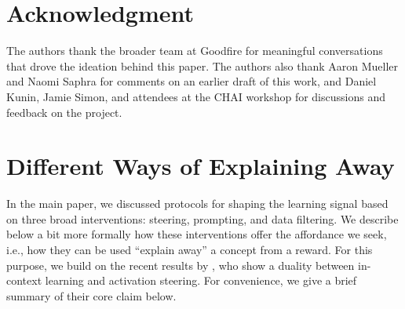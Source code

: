 \documentclass{article} %
\begin{document}
\section*{Acknowledgment}
The authors thank the broader team at Goodfire for meaningful conversations that drove the ideation behind this paper. The authors also thank Aaron Mueller and Naomi Saphra for comments on an earlier draft of this work, and Daniel Kunin, Jamie Simon, and attendees at the CHAI workshop for discussions and feedback on the project.




\clearpage




\clearpage
\appendix

\section{Different Ways of Explaining Away}
\label{app:formal_explanation}

In the main paper, we discussed protocols for shaping the learning signal based on three broad interventions: steering, prompting, and data filtering.
% 
We describe below a bit more formally how these interventions offer the affordance we seek, i.e.,  how they can be used ``explain away'' a concept from a reward.
% 
For this purpose, we build on the recent results by \cite{bigelow2025belief}, who show a duality between in-context learning and activation steering.
% 
For convenience, we give a brief summary of their core claim below.
\end{document}
